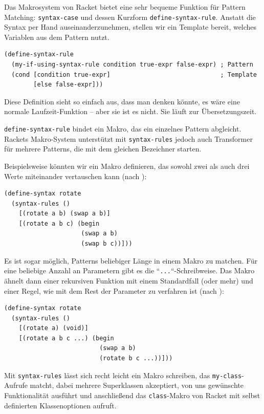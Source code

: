 Das Makrosystem von Racket bietet eine sehr bequeme Funktion für Pattern Matching: \texttt{syntax-case} und dessen Kurzform \texttt{define-syntax-rule}. Anstatt die Syntax per Hand auseinanderzunehmen, stellen wir ein Template bereit, welches Variablen aus dem Pattern nutzt.

\begin{lstlisting}
(define-syntax-rule 
  (my-if-using-syntax-rule condition true-expr false-expr) ; Pattern
  (cond [condition true-expr]                              ; Template
        [else false-expr]))
\end{lstlisting}

Diese Definition sieht so einfach aus, dass man denken könnte, es wäre eine normale Laufzeit-Funktion -- aber sie ist es nicht. Sie läuft zur Übersetzungszeit. 


\texttt{define-syntax-rule} bindet ein Makro, das ein einzelnes Pattern abgleicht. Rackets Makro-System unterstützt mit \texttt{syntax-rules} jedoch auch Transformer für mehrere Patterns, die mit dem gleichen Bezeichner starten.

Beispielsweise könnten wir ein Makro definieren, das sowohl zwei als auch drei Werte miteinander vertauschen kann (nach \cite{racketguide-macros}):

\begin{lstlisting}
(define-syntax rotate
  (syntax-rules ()
    [(rotate a b) (swap a b)]
    [(rotate a b c) (begin
                     (swap a b)
                     (swap b c))]))
\end{lstlisting}

Es ist sogar möglich, Patterns beliebiger Länge in einem Makro zu matchen. Für eine beliebige Anzahl an Parametern gibt es die ``\texttt{...}``-Schreibweise. Das Makro ähnelt dann einer rekursiven Funktion mit einem Standardfall (oder mehr) und einer Regel, wie mit dem Rest der Parameter zu verfahren ist (nach \cite{racketguide-macros}):

\begin{lstlisting}
(define-syntax rotate
  (syntax-rules ()
    [(rotate a) (void)]
    [(rotate a b c ...) (begin
                          (swap a b)
                          (rotate b c ...))]))
\end{lstlisting}

Mit \texttt{syntax-rules} lässt sich recht leicht ein Makro schreiben, das  \texttt{my-class}-Aufrufe matcht, dabei mehrere Superklassen akzeptiert, von uns gewünschte Funktionalität ausführt und anschließend das \texttt{class}-Makro von Racket mit selbst definierten Klassenoptionen aufruft.


